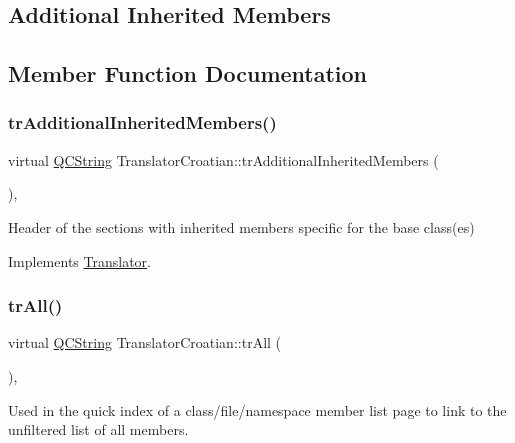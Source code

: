 \subsection*{Additional Inherited Members}


\subsection{Member Function Documentation}
\mbox{\label{class_translator_croatian_af21178f49ef1c7763b9505365cc95510}} 
\subsubsection{\texorpdfstring{trAdditionalInheritedMembers()}{trAdditionalInheritedMembers()}}
{\footnotesize\ttfamily virtual \mbox{\hyperlink{class_q_c_string}{Q\+C\+String}} Translator\+Croatian\+::tr\+Additional\+Inherited\+Members (\begin{DoxyParamCaption}{ }\end{DoxyParamCaption})\hspace{0.3cm}{\ttfamily [inline]}, {\ttfamily [virtual]}}

Header of the sections with inherited members specific for the base class(es) 

Implements \mbox{\hyperlink{class_translator}{Translator}}.

\mbox{\label{class_translator_croatian_ac1eae452db2fbba201451b76e80c827d}} 
\subsubsection{\texorpdfstring{trAll()}{trAll()}}
{\footnotesize\ttfamily virtual \mbox{\hyperlink{class_q_c_string}{Q\+C\+String}} Translator\+Croatian\+::tr\+All (\begin{DoxyParamCaption}{ }\end{DoxyParamCaption})\hspace{0.3cm}{\ttfamily [inline]}, {\ttfamily [virtual]}}

Used in the quick index of a class/file/namespace member list page to link to the unfiltered list of all members. 

